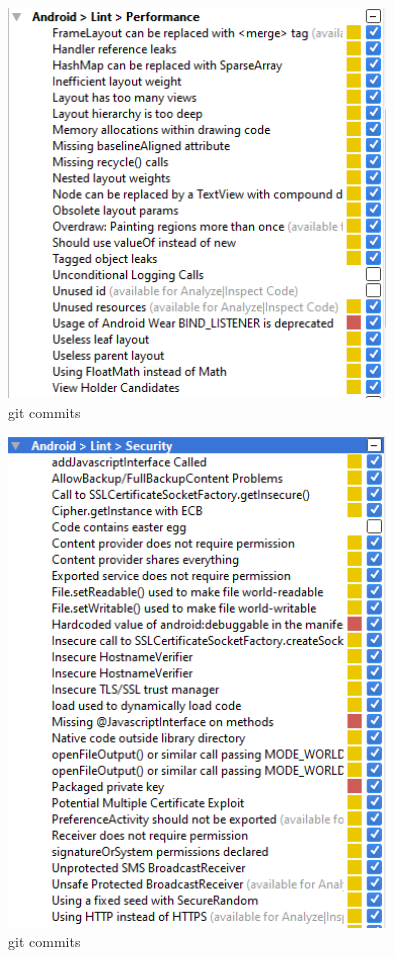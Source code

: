 \begin{figure}[H]
  		\centering
      	\includegraphics[width=100mm]{Capture5}	      	
  		\caption{git commits}
\end{figure}

\begin{figure}[H]
  		\centering
      	\includegraphics[width=100mm]{Capture6}	      	
  		\caption{git commits}
\end{figure}

